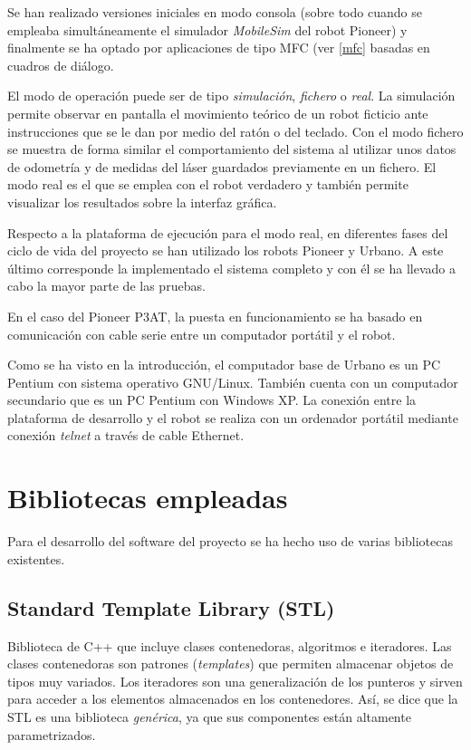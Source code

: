 Se han realizado versiones iniciales en modo consola (sobre todo cuando se empleaba simultáneamente el simulador \emph{MobileSim} del robot Pioneer) y finalmente se ha optado por aplicaciones de tipo MFC (ver \ref{mfc} basadas en cuadros de diálogo.

El modo de operación puede ser de tipo \emph{simulación}, \emph{fichero} o \emph{real}. La simulación permite observar en pantalla el movimiento teórico de un robot ficticio ante instrucciones que se le dan por medio del ratón o del teclado. Con el modo fichero se muestra de forma similar el comportamiento del sistema al utilizar unos datos de odometría y de medidas del láser guardados previamente en un fichero. El modo real es el que se emplea con el robot verdadero y también permite visualizar los resultados sobre la interfaz gráfica.

Respecto a la plataforma de ejecución para el modo real, en diferentes fases del ciclo de vida del proyecto se han utilizado los robots Pioneer y Urbano. A este último corresponde la implementado el sistema completo y con él se ha llevado a cabo la mayor parte de las pruebas.

En el caso del Pioneer P3AT, la puesta en funcionamiento se ha basado en comunicación con cable serie entre un computador portátil y el robot.

Como se ha visto en la introducción, el computador base de Urbano es un PC Pentium con sistema operativo GNU/Linux. También cuenta con un computador secundario que es un PC Pentium con Windows XP. La conexión entre la plataforma de desarrollo y el robot se realiza con un ordenador portátil mediante conexión \emph{telnet} a través de cable Ethernet.

\section{Bibliotecas empleadas}
Para el desarrollo del software del proyecto se ha hecho uso de varias bibliotecas existentes.

\subsection{Standard Template Library (STL)}

Biblioteca de C++ que incluye clases contenedoras, algoritmos e iteradores. Las clases contenedoras son patrones (\emph{templates}) que permiten almacenar objetos de tipos muy variados. Los iteradores son una generalización de los punteros y sirven para acceder a los elementos almacenados en los contenedores. Así, se dice que la STL es una biblioteca \emph{genérica}, ya que sus componentes están altamente parametrizados.

